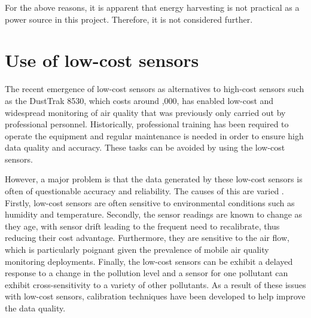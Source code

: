 \documentclass[11pt,twosided,a4paper]{report}
\begin{document}
For the above reasons, it is apparent that energy harvesting is not practical as a power source in this project. Therefore, it is not considered further.






\section{Use of low-cost sensors} \label{lowcostsensors}

The recent emergence of low-cost sensors as alternatives to high-cost sensors such as the DustTrak 8530, which costs around ,000, has enabled low-cost and widespread monitoring of air quality that was previously only carried out by professional personnel. Historically, professional training has been required to operate the equipment and regular maintenance is needed in order to ensure high data quality and accuracy. These tasks can be avoided by using the low-cost sensors.

However, a major problem is that the data generated by these low-cost sensors is often of questionable accuracy and reliability. The causes of this are varied \citep{Clements2017lowcostworkshop}. Firstly, low-cost sensors are often sensitive to   environmental conditions such as humidity and temperature. Secondly, the sensor readings are known to change as they age, with sensor drift leading to the frequent need to recalibrate, thus reducing their cost advantage. Furthermore, they are sensitive to the air flow, which is particularly poignant given the prevalence of mobile air quality monitoring deployments. Finally, the low-cost sensors can be exhibit a delayed response to a change in the pollution level and a sensor for one pollutant can exhibit cross-sensitivity to a variety of other pollutants. As a result of these issues with low-cost sensors, calibration techniques have been developed to help improve the data quality.
\end{document}

